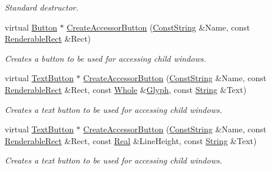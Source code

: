 \begin{DoxyCompactItemize}
\begin{DoxyCompactList}\small\item\em Standard destructor. \item\end{DoxyCompactList}\item 
virtual \hyperlink{classMezzanine_1_1UI_1_1Button}{Button} $\ast$ \hyperlink{classMezzanine_1_1UI_1_1MenuWindow_a52aa67a7c69ed7ad7af746c3230e08f8}{CreateAccessorButton} (\hyperlink{namespaceMezzanine_a63cd699ac54b73953f35ec9cfc05e506}{ConstString} \&Name, const \hyperlink{structMezzanine_1_1UI_1_1RenderableRect}{RenderableRect} \&Rect)
\begin{DoxyCompactList}\small\item\em Creates a button to be used for accessing child windows. \item\end{DoxyCompactList}\item 
virtual \hyperlink{classMezzanine_1_1UI_1_1TextButton}{TextButton} $\ast$ \hyperlink{classMezzanine_1_1UI_1_1MenuWindow_a4520c4a2e0b680ac52c0669d92d2c4f5}{CreateAccessorButton} (\hyperlink{namespaceMezzanine_a63cd699ac54b73953f35ec9cfc05e506}{ConstString} \&Name, const \hyperlink{structMezzanine_1_1UI_1_1RenderableRect}{RenderableRect} \&Rect, const \hyperlink{namespaceMezzanine_adcbb6ce6d1eb4379d109e51171e2e493}{Whole} \&\hyperlink{classMezzanine_1_1UI_1_1Glyph}{Glyph}, const \hyperlink{namespaceMezzanine_acf9fcc130e6ebf08e3d8491aebcf1c86}{String} \&Text)
\begin{DoxyCompactList}\small\item\em Creates a text button to be used for accessing child windows. \item\end{DoxyCompactList}\item 
virtual \hyperlink{classMezzanine_1_1UI_1_1TextButton}{TextButton} $\ast$ \hyperlink{classMezzanine_1_1UI_1_1MenuWindow_a559f35d54a23ebb211c8b47f8770f25b}{CreateAccessorButton} (\hyperlink{namespaceMezzanine_a63cd699ac54b73953f35ec9cfc05e506}{ConstString} \&Name, const \hyperlink{structMezzanine_1_1UI_1_1RenderableRect}{RenderableRect} \&Rect, const \hyperlink{namespaceMezzanine_a726731b1a7df72bf3583e4a97282c6f6}{Real} \&LineHeight, const \hyperlink{namespaceMezzanine_acf9fcc130e6ebf08e3d8491aebcf1c86}{String} \&Text)
\begin{DoxyCompactList}\small\item\em Creates a text button to be used for accessing child windows. \item\end{DoxyCompactList}\item 

\end{DoxyCompactItemize}
